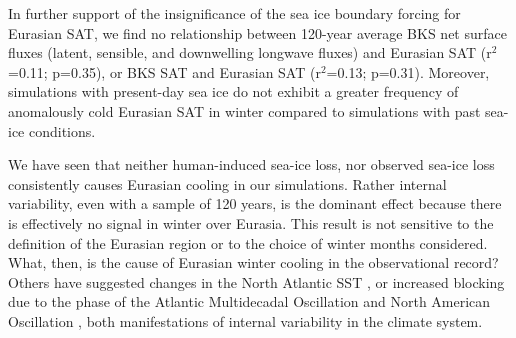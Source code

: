 \documentclass{nature}
\begin{document}
In further support of the insignificance of the sea ice boundary forcing for Eurasian SAT, we find no relationship between 120-year average BKS net surface fluxes (latent, sensible, and downwelling longwave fluxes) and Eurasian SAT (r$^2$=0.11; p=0.35), or BKS SAT and Eurasian SAT (r$^2$=0.13; p=0.31). Moreover, simulations with present-day sea ice do not exhibit a greater frequency of anomalously cold Eurasian SAT in winter compared to simulations with past sea-ice conditions.%


We have seen that neither human-induced sea-ice loss, nor observed sea-ice loss consistently causes Eurasian cooling in our simulations. Rather internal variability, even with a sample of 120 years, is the dominant effect because there is effectively no signal in winter over Eurasia. This result is not sensitive to the definition of the Eurasian region or to the choice of winter months considered. What, then, is the cause of Eurasian winter cooling in the observational record? Others have suggested changes in the North Atlantic SST \cite{sato14}, or increased blocking due to the phase of the Atlantic Multidecadal Oscillation and North American Oscillation \cite{peings14b}, both manifestations of internal variability in the climate system. 
\end{document}

